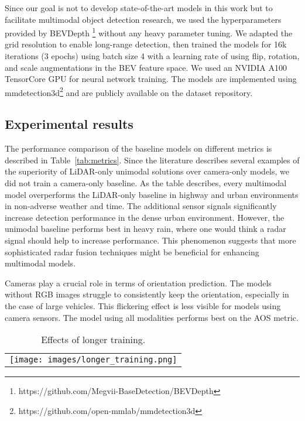 \documentclass{article}
\begin{document}
Since our goal is not to develop state-of-the-art models in this work but to facilitate multimodal object detection research, we used the hyperparameters provided by BEVDepth \footnote{https://github.com/Megvii-BaseDetection/BEVDepth} without any heavy parameter tuning. We adapted the grid resolution to enable long-range detection, then trained the models for 16k iterations (3 epochs) using batch size 4 with a learning rate of  using flip, rotation, and scale augmentations in the BEV feature space. We used an NVIDIA A100 TensorCore GPU for neural network training. The models are implemented using mmdetection3d\footnote{https://github.com/open-mmlab/mmdetection3d} and are publicly available on the dataset repository.

\subsection{Experimental results}
\label{subsec:exp_results}
The performance comparison of the baseline models on different metrics is described in Table~\ref{tab:metrics}. Since the literature describes several examples \citep{qian20223d, liu2022bevfusion} of the superiority of LiDAR-only unimodal solutions over camera-only models, we did not train a camera-only baseline. As the table describes, every multimodal model overperforms the LiDAR-only baseline in highway and urban environments in non-adverse weather and time. The additional sensor signals significantly increase detection performance in the dense urban environment. However, the unimodal baseline performs best in heavy rain, where one would think a radar signal should help to increase performance. This phenomenon suggests that more sophisticated radar fusion techniques might be beneficial for enhancing multimodal models.

Cameras play a crucial role in terms of orientation prediction. The models without RGB images struggle to consistently keep the orientation, especially in the case of large vehicles. This flickering effect is less visible for models using camera sensors. The model using all modalities performs best on the AOS metric.

\begin{table}[t]
  \centering  
  \begin{tabular}{c}       
    \texttt{[image: images/longer\_training.png]}
  \end{tabular}
  \caption{Effects of longer training.}
  \label{tab:metrics-long}
\end{table}
\end{document}

